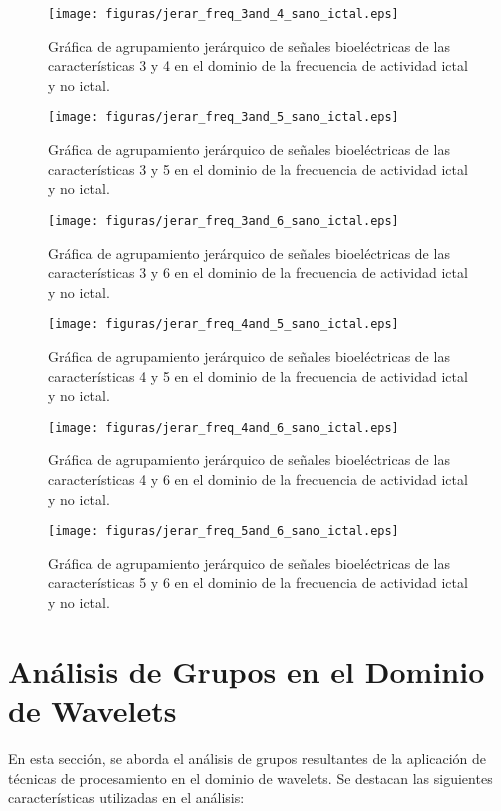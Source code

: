 \begin{figure}[H]
    \centering
    \texttt{[image: figuras/jerar\_freq\_3and\_4\_sano\_ictal.eps]}
    \caption{Gráfica de agrupamiento jerárquico de señales bioeléctricas de las características 3 y 4 en el dominio de la frecuencia de actividad ictal y no ictal.}
    \label{fig: jerar_freq_3_4}
\end{figure}
\begin{figure}[H]
    \centering
    \texttt{[image: figuras/jerar\_freq\_3and\_5\_sano\_ictal.eps]}
    \caption{Gráfica de agrupamiento jerárquico de señales bioeléctricas de las características 3 y 5 en el dominio de la frecuencia de actividad ictal y no ictal.}
    \label{fig: jerar_freq_3_5}
\end{figure}
\begin{figure}[H]
    \centering
    \texttt{[image: figuras/jerar\_freq\_3and\_6\_sano\_ictal.eps]}
    \caption{Gráfica de agrupamiento jerárquico de señales bioeléctricas de las características 3 y 6 en el dominio de la frecuencia de actividad ictal y no ictal.}
    \label{fig: jerar_freq_3_6}
\end{figure}
\begin{figure}[H]
    \centering
    \texttt{[image: figuras/jerar\_freq\_4and\_5\_sano\_ictal.eps]}
    \caption{Gráfica de agrupamiento jerárquico de señales bioeléctricas de las características 4 y 5 en el dominio de la frecuencia de actividad ictal y no ictal.}
    \label{fig: jerar_freq_4_5}
\end{figure}
\begin{figure}[H]
    \centering
    \texttt{[image: figuras/jerar\_freq\_4and\_6\_sano\_ictal.eps]}
    \caption{Gráfica de agrupamiento jerárquico de señales bioeléctricas de las características 4 y 6 en el dominio de la frecuencia de actividad ictal y no ictal.}
    \label{fig: jerar_freq_4_6}
\end{figure}
\begin{figure}[H]
    \centering
    \texttt{[image: figuras/jerar\_freq\_5and\_6\_sano\_ictal.eps]}
    \caption{Gráfica de agrupamiento jerárquico de señales bioeléctricas de las características 5 y 6 en el dominio de la frecuencia de actividad ictal y no ictal.}
    \label{fig: jerar_freq_5_6}
\end{figure}


\section{Análisis de Grupos en el Dominio de Wavelets}
En esta sección, se aborda el análisis de grupos resultantes de la aplicación de técnicas de procesamiento en el dominio de wavelets. Se destacan las siguientes características utilizadas en el análisis:

